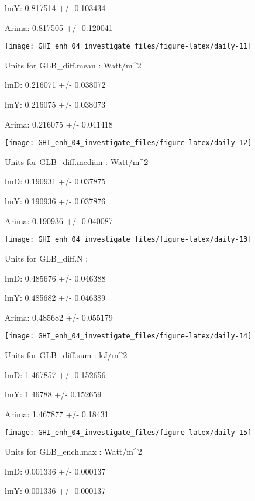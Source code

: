 \documentclass[
  10pt,
  a4paper,oneside]{article}
\begin{document}
lmY: 0.817514 +/- 0.103434

Arima: 0.817505 +/- 0.120041

\begin{center}\texttt{[image: GHI\_enh\_04\_investigate\_files/figure-latex/daily-11]} \end{center}

Units for GLB\_diff.mean : Watt/m\^{}2

lmD: 0.216071 +/- 0.038072

lmY: 0.216075 +/- 0.038073

Arima: 0.216075 +/- 0.041418

\begin{center}\texttt{[image: GHI\_enh\_04\_investigate\_files/figure-latex/daily-12]} \end{center}

Units for GLB\_diff.median : Watt/m\^{}2

lmD: 0.190931 +/- 0.037875

lmY: 0.190936 +/- 0.037876

Arima: 0.190936 +/- 0.040087

\begin{center}\texttt{[image: GHI\_enh\_04\_investigate\_files/figure-latex/daily-13]} \end{center}

Units for GLB\_diff.N :

lmD: 0.485676 +/- 0.046388

lmY: 0.485682 +/- 0.046389

Arima: 0.485682 +/- 0.055179

\begin{center}\texttt{[image: GHI\_enh\_04\_investigate\_files/figure-latex/daily-14]} \end{center}

Units for GLB\_diff.sum : kJ/m\^{}2

lmD: 1.467857 +/- 0.152656

lmY: 1.46788 +/- 0.152659

Arima: 1.467877 +/- 0.18431

\begin{center}\texttt{[image: GHI\_enh\_04\_investigate\_files/figure-latex/daily-15]} \end{center}

Units for GLB\_ench.max : Watt/m\^{}2

lmD: 0.001336 +/- 0.000137

lmY: 0.001336 +/- 0.000137
\end{document}
